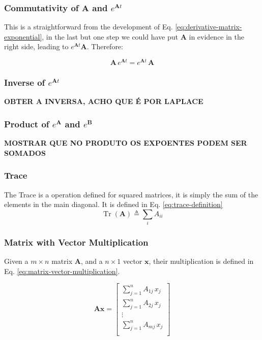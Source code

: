 \documentclass[12pt]{article}
\newcommand{\bvec}[1]{\boldsymbol{\mathbf{#1}}} %
\newcommand{\mat}[1]{\boldsymbol{\mathbf{#1}}}
\DeclareMathOperator{\Tr}{Tr}
\begin{document}
\subsubsection{Commutativity of $\mathbf{A}$ and $e^{\mathbf{A}t}$}
This is a straightforward from the development of Eq. \ref{eq:derivative-matrix-exponential}, in the last but one step we could have put $\mathbf{A}$ in evidence in the right side, leading to $e^{\mathbf{A}t}\mathbf{A}$. Therefore:

\begin{equation}
\mathbf{A} \, e^{\mathbf{A} t} = e^{\mathbf{A} t} \, \mathbf{A} 
\label{eq:commutativity-exp-of-a-and-a}
\end{equation}

\subsubsection{Inverse of $e^{\mathbf{A}t}$}
\color{blue}
\textbf{OBTER A INVERSA, ACHO QUE É POR LAPLACE}
\color{black}

\subsubsection{Product of $e^{\mathbf{A}}$ and $e^{\mathbf{B}}$}
\color{blue}
\textbf{MOSTRAR QUE NO PRODUTO OS EXPOENTES PODEM SER SOMADOS}
\color{black}

\subsubsection{Trace}
The Trace is a operation defined for squared matrices, it is simply the sum of the elements in the main diagonal. It is defined in Eq. \ref{eq:trace-definition}
\begin{equation}
    \Tr(\mat{A}) \triangleq \sum\limits_{i} A_{ii}
    \label{eq:trace-definition}
\end{equation}

\subsubsection{Matrix with Vector Multiplication}
Given a $m\times n$ matrix $\mat{A}$, and a $n\times 1$ vector $\bvec{x}$, their multiplication is defined in Eq. \ref{eq:matrix-vector-multiplication}.

\begin{equation}
    \mat{A} \bvec{x} = \begin{bmatrix}
        \sum\limits_{j=1}^{n} A_{1j} \,x_j \\
        \sum\limits_{j=1}^{n} A_{2j} \,x_j \\
        \vdots \\
        \sum\limits_{j=1}^{n} A_{mj} \,x_j \\
    \end{bmatrix}
    \label{eq:matrix-vector-multiplication}
\end{equation}
\end{document}
